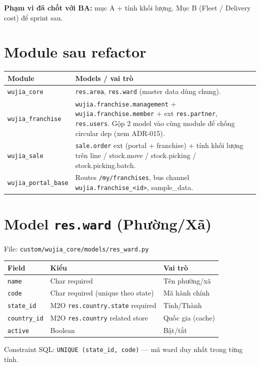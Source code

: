 \textbf{Phạm vi đã chốt với BA:} mục A + tính khối lượng. Mục B (Fleet / Delivery cost) để sprint sau.

\section{Module sau refactor}

\begin{longtable}{p{4.5cm} p{9.5cm}}
\toprule
\textbf{Module} & \textbf{Models / vai trò} \\
\midrule
\endhead
\texttt{wujia\_core} & \texttt{res.area}, \texttt{res.ward} (master data dùng chung). \\
\texttt{wujia\_franchise} & \texttt{wujia.franchise.management} + \texttt{wujia.franchise.member} + ext \texttt{res.partner}, \texttt{res.users}. Gộp 2 model vào cùng module để chống circular dep (xem ADR-015). \\
\texttt{wujia\_sale} & \texttt{sale.order} ext (portal + franchise) + tính khối lượng trên line / stock.move / stock.picking / stock.picking.batch. \\
\texttt{wujia\_portal\_base} & Routes \texttt{/my/franchises}, bus channel \texttt{wujia.franchise\_<id>}, sample\_data. \\
\bottomrule
\end{longtable}

\section{Model \texttt{res.ward} (Phường/Xã)}

File: \texttt{custom/wujia\_core/models/res\_ward.py}

\begin{longtable}{p{4cm} p{4cm} p{7cm}}
\toprule
\textbf{Field} & \textbf{Kiểu} & \textbf{Vai trò} \\
\midrule
\endhead
\texttt{name} & Char required & Tên phường/xã \\
\texttt{code} & Char required (unique theo state) & Mã hành chính \\
\texttt{state\_id} & M2O \texttt{res.country.state} required & Tỉnh/Thành \\
\texttt{country\_id} & M2O \texttt{res.country} related store & Quốc gia (cache) \\
\texttt{active} & Boolean & Bật/tắt \\
\bottomrule
\end{longtable}

Constraint SQL: \texttt{UNIQUE (state\_id, code)} --- mã ward duy nhất trong từng tỉnh.

